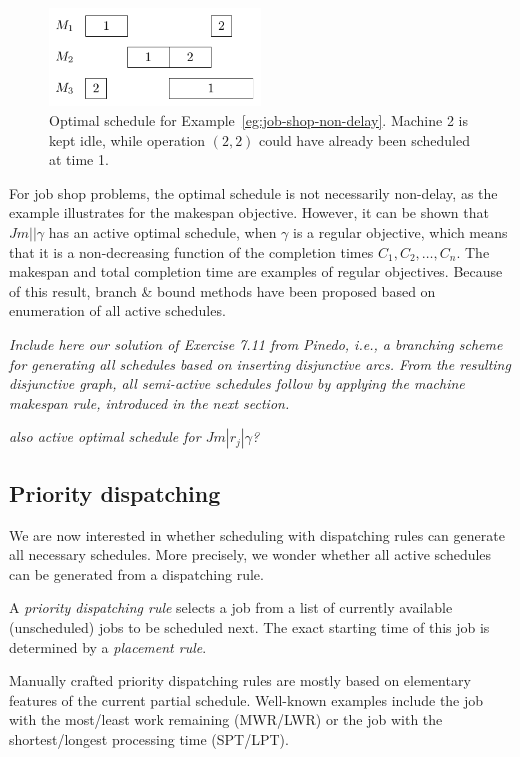 \documentclass{article}
\theoremstyle{definition}
\theoremstyle{plain}
\begin{document}
\begin{figure}
  \centering
  \label{fig:job-shop-delay}
  \includegraphics[width=0.5\textwidth]{figures/job-shop-delay.pdf}
  \caption{Optimal schedule for Example~\ref{eg:job-shop-non-delay}. Machine 2
    is kept idle, while operation $(2,2)$ could have already been scheduled at
    time 1.}
\end{figure}

For job shop problems, the optimal schedule is not necessarily non-delay, as the
example illustrates for the makespan objective. However, it can be
shown that $Jm || \gamma$ has an active optimal schedule, when $\gamma$ is a
regular objective, which means that it is a non-decreasing function of the
completion times $C_1, C_2, \dots, C_n$. The makespan and total completion time
are examples of regular objectives. Because of this result, branch \& bound
methods have been proposed based on enumeration of all active schedules.

\textit{\color{blue}Include here our solution of Exercise 7.11 from Pinedo,
i.e., a branching scheme for generating all schedules based on inserting
disjunctive arcs. From the resulting disjunctive graph, all semi-active
schedules follow by applying the machine makespan rule, introduced in the next
section.}

\textit{\color{blue}also active optimal schedule for $Jm | r_j | \gamma$?}

\subsection{Priority dispatching}

We are now interested in whether scheduling with dispatching rules can generate
all necessary schedules. More precisely, we wonder whether all active schedules
can be generated from a dispatching rule.

A \textit{priority dispatching rule} selects a job from a list of currently
available (unscheduled) jobs to be scheduled next. The exact starting time of
this job is determined by a \textit{placement rule}.

Manually crafted priority dispatching rules are mostly based on elementary
features of the current partial schedule. Well-known examples include the job
with the most/least work remaining (MWR/LWR) or the job with the
shortest/longest processing time (SPT/LPT).
\end{document}
